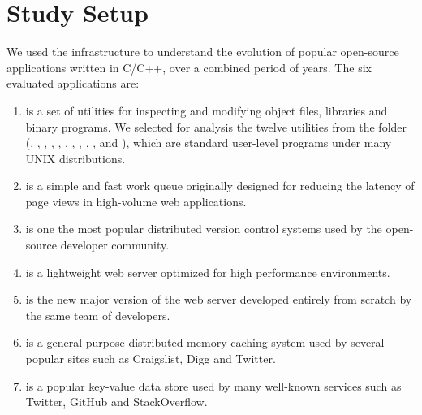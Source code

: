 \section{Study Setup}
\label{sec:study-setup}

We used the \covrig infrastructure to understand the evolution of
\numSystems popular open-source applications written in C/C++, over a
combined period of \numYears years. The six evaluated applications are:

\begin{enumerate}

\item[\gnu~\binutils\footnote{\url{http://www.gnu.org/software/binutils/}}]
is a set of utilities for inspecting and modifying object files,
libraries and binary programs.  We selected for analysis the twelve
utilities from the  folder (, ,
, , , , ,
, , ,  and ),
which are standard user-level programs under many UNIX distributions.

\item[\beanstalkd\footnote{\url{http://kr.github.io/beanstalkd/}}]
is a simple and fast work queue originally designed for reducing the latency of
page views in high-volume web applications.

\item[\git\footnote{\url{http://git-scm.com/}}]
is one the most popular distributed version control systems used by the
open-source developer community.

\item[\lighttpd\footnote{\url{http://www.lighttpd.net/}}]
is a lightweight web server optimized for high performance environments.

\item[\lighttpdtwo\footnote{\url{http://redmine.lighttpdtwo.net/projects/lighttpdtwo2/}}]
is the new major version of the \lighttpd web server developed entirely from
scratch by the same team of developers.

\item[\memcached\footnote{\url{http://memcached.org/}}]
is a general-purpose distributed memory caching system used by several popular
sites such as Craigslist, Digg and Twitter.

\item[\redis\footnote{\url{http://redis.io/}}]
is a popular key-value data store used by many well-known services such as
Twitter, GitHub and StackOverflow.


\end{enumerate}
